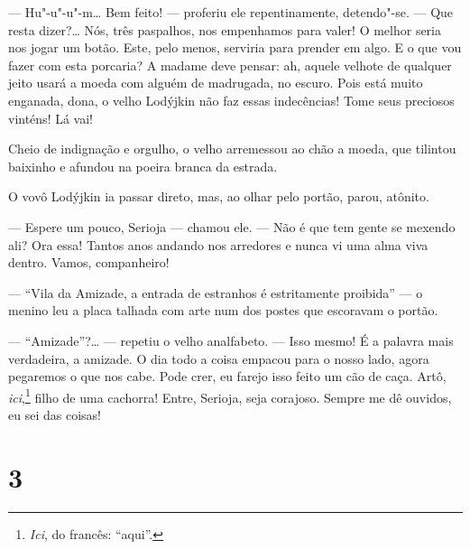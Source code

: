 --- Hu"-u"-u"-m\ldots{} Bem feito! --- proferiu ele repentinamente, detendo"-se.
--- Que resta dizer?\ldots{} Nós, três paspalhos, nos empenhamos para valer!
O melhor seria nos jogar um botão. Este, pelo menos, serviria para
prender em algo. E o que vou fazer com esta porcaria? A madame deve
pensar: ah, aquele velhote de qualquer jeito usará a moeda com alguém de
madrugada, no escuro. Pois está muito enganada, dona, o velho Lodýjkin
não faz essas indecências! Tome seus preciosos vinténs! Lá vai!

Cheio de indignação e orgulho, o velho arremessou ao chão a moeda, que
tilintou baixinho e afundou na poeira branca da estrada.


O vovô Lodýjkin ia passar direto, mas, ao olhar pelo portão, parou,
atônito.

--- Espere um pouco, Serioja --- chamou ele. --- Não é que tem gente se
mexendo ali? Ora essa! Tantos anos andando nos arredores e nunca vi uma
alma viva dentro. Vamos, companheiro!

--- ``Vila da Amizade, a entrada de estranhos é estritamente proibida''
--- o menino leu a placa talhada com arte num dos postes que escoravam o
portão.

--- ``Amizade''?\ldots{} --- repetiu o velho analfabeto. --- Isso mesmo! É a
palavra mais verdadeira, a amizade. O dia todo a coisa empacou para o
nosso lado, agora pegaremos o que nos cabe. Pode crer, eu farejo isso
feito um cão de caça. Artô, \emph{ici},\footnote{\emph{Ici}, do francês:
  ``aqui''.} filho de uma cachorra! Entre, Serioja, seja corajoso.
Sempre me dê ouvidos, eu sei das coisas!

\section{3}

